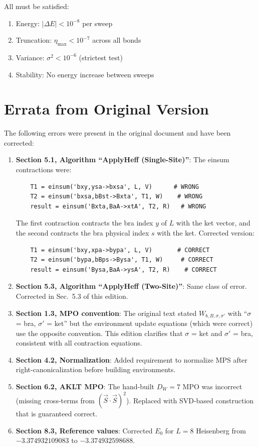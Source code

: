 \documentclass[aps,prb,onecolumn,scriptaddress]{revtex4-2}
\begin{document}
All must be satisfied:
\begin{enumerate}
\item Energy: $|\Delta E| < 10^{-8}$ per sweep
\item Truncation: $\eta_{\max} < 10^{-7}$ across all bonds
\item Variance: $\sigma^2 < 10^{-6}$ (strictest test)
\item Stability: No energy increase between sweeps
\end{enumerate}

\appendix

\section{Errata from Original Version}

The following errors were present in the original document and have been corrected:

\begin{enumerate}
\item \textbf{Section 5.1, Algorithm ``ApplyHeff (Single-Site)''}: The einsum contractions were:
\begin{verbatim}
	T1 = einsum('bxy,ysa->bxsa', L, V)      # WRONG
	T2 = einsum('bxsa,bBst->Bxta', T1, W)    # WRONG
	result = einsum('Bxta,BaA->xtA', T2, R)   # WRONG
\end{verbatim}
The first contraction contracts the bra index $y$ of $L$ with the ket vector, and the second contracts the bra physical index $s$ with the ket. Corrected version:
\begin{verbatim}
	T1 = einsum('bxy,xpa->bypa', L, V)       # CORRECT
	T2 = einsum('bypa,bBps->Bysa', T1, W)     # CORRECT
	result = einsum('Bysa,BaA->ysA', T2, R)    # CORRECT
\end{verbatim}

\item \textbf{Section 5.3, Algorithm ``ApplyHeff (Two-Site)''}: Same class of error. Corrected in Sec.~5.3 of this edition.

\item \textbf{Section 1.3, MPO convention}: The original text stated $W_{b,B,\sigma,\sigma'}$ with ``$\sigma$ = bra, $\sigma'$ = ket'' but the environment update equations (which were correct) use the opposite convention. This edition clarifies that $\sigma$ = ket and $\sigma'$ = bra, consistent with all contraction equations.

\item \textbf{Section 4.2, Normalization}: Added requirement to normalize MPS after right-canonicalization before building environments.

\item \textbf{Section 6.2, AKLT MPO}: The hand-built $D_W = 7$ MPO was incorrect (missing cross-terms from $(\vec{S}\cdot\vec{S})^2$). Replaced with SVD-based construction that is guaranteed correct.

\item \textbf{Section 8.3, Reference values}: Corrected $E_0$ for $L=8$ Heisenberg from $-3.374932109083$ to $-3.374932598688$.
\end{enumerate}
\end{document}
